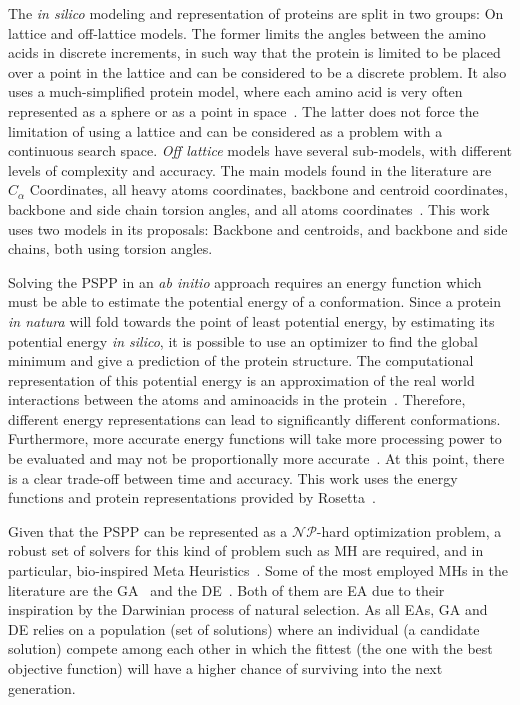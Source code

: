 The \textit{in silico} modeling and representation of proteins are split in two
groups: On lattice and off-lattice models. The former limits the angles between
the amino acids in discrete increments, in such way that the protein is limited
to be placed over a point in the lattice and can be considered to be a discrete
problem. It also uses a much-simplified protein model, where each amino acid is
very often represented as a sphere or as a point in space~\cite{berger1998protein}.
The latter does not force the limitation of using a
lattice and can be considered as a problem with
a continuous search space. \textit{Off lattice} models have several
sub-models, with different levels of complexity and accuracy. The main models
found in the literature are $C_\alpha$ Coordinates, all heavy atoms
coordinates, backbone and centroid coordinates, backbone and side chain torsion
angles, and all atoms coordinates~\cite{dorn2014three,rohl2004protein}.
This work uses two models in its proposals: Backbone and centroids, and backbone and side chains, both using torsion angles.

Solving the \ac{PSPP} in an \textit{ab initio} approach requires an energy function
which must be able to estimate the potential energy of a conformation. Since a
protein \textit{in natura} will fold towards the point of least potential
energy, by estimating its potential energy \textit{in silico}, it is possible to
use an optimizer to find the global minimum and give a prediction of the
protein structure. The computational representation of this potential energy is
an approximation of the real world interactions between the atoms and aminoacids
in the protein~\cite{alford2017rosetta}. Therefore,
different energy representations can lead to
significantly different conformations. Furthermore, more accurate energy
functions will take more processing power to be evaluated and may not be
proportionally more accurate~\cite{xu2012ab}. At this point,
there is a clear trade-off between time and accuracy.
This work uses the energy functions and protein representations provided by
Rosetta~\cite{rohl2004protein,leaver2011rosetta3}.

Given that the \ac{PSPP} can be represented as a $\mathcal{NP}$-hard optimization
problem, a robust set of solvers for this kind of problem such as
\ac{MH} are required, and in particular, bio-inspired Meta Heuristics~\cite{kar2016bio}.
Some of the most employed \ac{MH}s in the literature are the
\ac{GA}~\cite{holland1992genetic} and the
\ac{DE}~\cite{storn1997differential}. Both of them are
\ac{EA} due to their inspiration by the Darwinian process of natural
selection. As all \ac{EA}s, \ac{GA} and \ac{DE} relies on a population
(set of solutions) where an
individual (a candidate solution) compete among each other in which the fittest (the one
with the best objective function) will have a higher chance of surviving into
the next generation.

